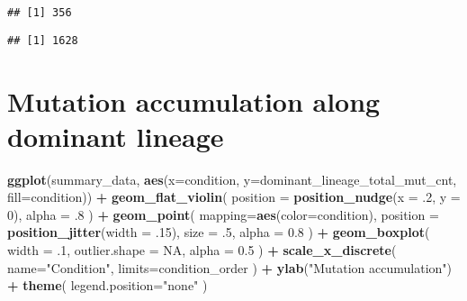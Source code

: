 \documentclass[]{book}
\newenvironment{Shaded}{\begin{snugshade}}{\end{snugshade}}
\newcommand{\DataTypeTok}[1]{\textcolor[rgb]{0.13,0.29,0.53}{#1}}
\newcommand{\DecValTok}[1]{\textcolor[rgb]{0.00,0.00,0.81}{#1}}
\newcommand{\FloatTok}[1]{\textcolor[rgb]{0.00,0.00,0.81}{#1}}
\newcommand{\KeywordTok}[1]{\textcolor[rgb]{0.13,0.29,0.53}{\textbf{#1}}}
\newcommand{\NormalTok}[1]{#1}
\newcommand{\OperatorTok}[1]{\textcolor[rgb]{0.81,0.36,0.00}{\textbf{#1}}}
\newcommand{\OtherTok}[1]{\textcolor[rgb]{0.56,0.35,0.01}{#1}}
\newcommand{\StringTok}[1]{\textcolor[rgb]{0.31,0.60,0.02}{#1}}
\begin{document}
\begin{verbatim}
## [1] 356
\end{verbatim}

\begin{Shaded}
\end{Shaded}

\begin{verbatim}
## [1] 1628
\end{verbatim}

\hypertarget{mutation-accumulation-along-dominant-lineage}{%
\section{Mutation accumulation along dominant lineage}\label{mutation-accumulation-along-dominant-lineage}}

\begin{Shaded}
\begin{Highlighting}[]
\KeywordTok{ggplot}\NormalTok{(summary_data, }\KeywordTok{aes}\NormalTok{(}\DataTypeTok{x=}\NormalTok{condition, }\DataTypeTok{y=}\NormalTok{dominant_lineage_total_mut_cnt, }\DataTypeTok{fill=}\NormalTok{condition)) }\OperatorTok{+}
\StringTok{  }\KeywordTok{geom_flat_violin}\NormalTok{(}
    \DataTypeTok{position =} \KeywordTok{position_nudge}\NormalTok{(}\DataTypeTok{x =} \FloatTok{.2}\NormalTok{, }\DataTypeTok{y =} \DecValTok{0}\NormalTok{),}
    \DataTypeTok{alpha =} \FloatTok{.8}
\NormalTok{  ) }\OperatorTok{+}
\StringTok{  }\KeywordTok{geom_point}\NormalTok{(}
    \DataTypeTok{mapping=}\KeywordTok{aes}\NormalTok{(}\DataTypeTok{color=}\NormalTok{condition),}
    \DataTypeTok{position =} \KeywordTok{position_jitter}\NormalTok{(}\DataTypeTok{width =} \FloatTok{.15}\NormalTok{),}
    \DataTypeTok{size =} \FloatTok{.5}\NormalTok{,}
    \DataTypeTok{alpha =} \FloatTok{0.8}
\NormalTok{  ) }\OperatorTok{+}
\StringTok{  }\KeywordTok{geom_boxplot}\NormalTok{(}
    \DataTypeTok{width =} \FloatTok{.1}\NormalTok{,}
    \DataTypeTok{outlier.shape =} \OtherTok{NA}\NormalTok{,}
    \DataTypeTok{alpha =} \FloatTok{0.5}
\NormalTok{  ) }\OperatorTok{+}
\StringTok{  }\KeywordTok{scale_x_discrete}\NormalTok{(}
    \DataTypeTok{name=}\StringTok{"Condition"}\NormalTok{,}
    \DataTypeTok{limits=}\NormalTok{condition_order}
\NormalTok{  ) }\OperatorTok{+}
\StringTok{  }\KeywordTok{ylab}\NormalTok{(}\StringTok{"Mutation accumulation"}\NormalTok{) }\OperatorTok{+}
\StringTok{  }\KeywordTok{theme}\NormalTok{(}
    \DataTypeTok{legend.position=}\StringTok{"none"}
\NormalTok{  )}
\end{Highlighting}
\end{Shaded}
\end{document}
